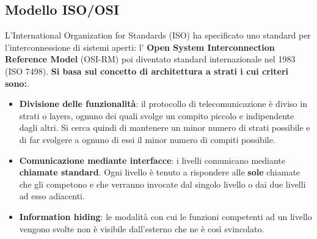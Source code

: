 \documentclass[11pt,a4paper,oneside]{book}
\theoremstyle{definition}
\begin{document}
\subsection{Modello ISO/OSI}
L’International Organization for Standards (ISO) ha specificato
uno standard per l’interconnessione di sistemi aperti: l' \textbf{Open System Interconnection Reference Model} (OSI-RM) poi diventato standard internazionale nel 1983 (ISO 7498). \textbf{Si basa sul concetto di architettura a strati i cui criteri sono:}.
\begin{itemize}
	\item \textbf{Divisione delle funzionalità}: il protocollo di telecomunicazione è diviso in strati o layers, ognuno dei quali svolge un compito piccolo e indipendente dagli altri.\newline
	      Si cerca quindi di mantenere un minor numero di strati possibile e di far svolgere a ognuno di essi il minor numero di compiti possibile.
	\item \textbf{Comunicazione mediante interfacce}: i livelli comunicano mediante \textbf{chiamate standard}. Ogni livello è tenuto a rispondere alle \textbf{sole} chiamate che gli competono e che verranno
	      invocate dal singolo livello o dai due livelli ad esso adiacenti.
	\item \textbf{Information hiding}: le modalità con cui le funzioni competenti ad un livello
	      vengono svolte non è visibile dall'esterno che ne è così
	      svincolato.
\end{itemize}

\pagebreak
\end{document}
